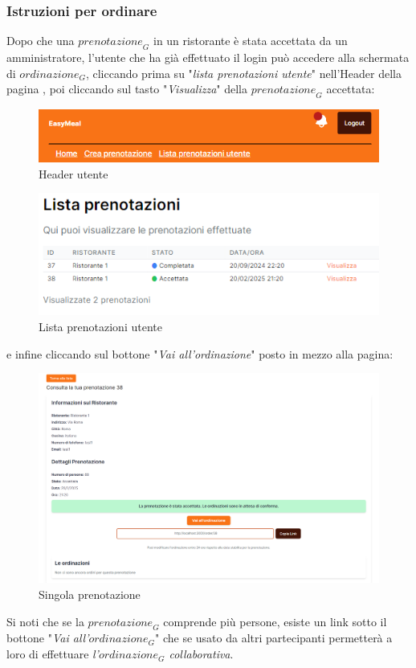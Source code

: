 \newpage
\subsubsection{Istruzioni per ordinare}
Dopo che una $\textit{prenotazione}_G$ in un ristorante è stata accettata da un amministratore, l'utente che ha già effettuato il login può accedere alla schermata di $\textit{ordinazione}_G$, cliccando prima su "\emph{lista prenotazioni utente}" nell'Header della pagina , poi cliccando sul tasto "\emph{Visualizza}" della $\textit{prenotazione}_G$ accettata: 
\begin{figure}[H]
    \centering
    \includegraphics[width=0.6\linewidth]{img/header_utente.png}
    \caption{Header utente}
    \label{fig:header_utente}
\end{figure}
\begin{figure}[H]
    \centering
    \includegraphics[width=0.6\linewidth]{img/lista_prenotazioni_utente.PNG}
    \caption{Lista prenotazioni utente}
    \label{fig:Lista prenotazioni utente}
\end{figure}
e infine cliccando sul bottone "\emph{Vai all'ordinazione}" posto in mezzo alla pagina:
\begin{figure}[H]
    \centering
    \includegraphics[width=0.75\linewidth]{img/dettaglio_prenotazione.PNG}
    \caption{Singola prenotazione}
    \label{fig:Singola prenotazione}
\end{figure}
 Si noti che se la $\textit{prenotazione}_G$ comprende più persone, esiste un link sotto il bottone "\emph{Vai all'$\textit{ordinazione}_G$}" che se usato da altri partecipanti permetterà a loro di effettuare \emph{l'$\textit{ordinazione}_G$ collaborativa}.
